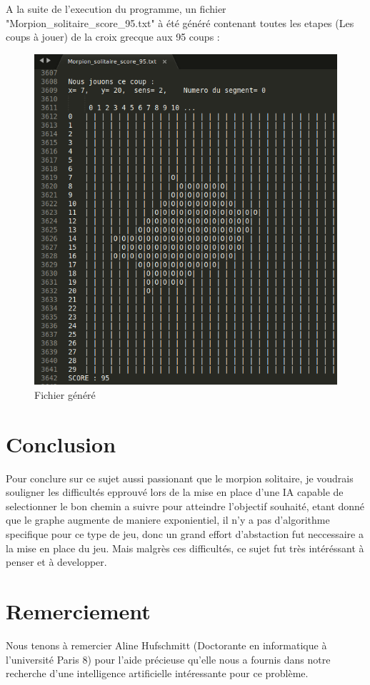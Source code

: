 \documentclass[11pt]{article}
\begin{document}
A la suite de l'execution du programme, un fichier "Morpion\_solitaire\_score\_95.txt" à été généré contenant toutes les etapes (Les coups à jouer) de la croix grecque aux 95 coups :
\begin{figure}[!h]
\centering
\includegraphics[scale=2.00]{exemple95.png}
\caption{Fichier généré}
\label{}
\end{figure}


		
		\section{Conclusion}
		Pour conclure sur ce sujet aussi passionant que le morpion solitaire, je voudrais souligner les difficultés epprouvé lors de la mise en place d'une IA capable de selectionner le bon chemin a suivre pour atteindre l'objectif souhaité, etant donné que le graphe augmente de maniere exponientiel, il n'y a pas d'algorithme specifique pour ce type de jeu, donc un grand effort d'abstaction fut neccessaire a la mise en place du jeu. Mais malgrès ces difficultés, ce sujet fut très intéréssant à penser et à developper.
		
\section{Remerciement}
Nous tenons à remercier Aline Hufschmitt (Doctorante en informatique à l'université Paris 8) pour l'aide précieuse qu'elle nous a fournis dans notre recherche d'une intelligence artificielle intéressante pour ce problème.
\end{document}
